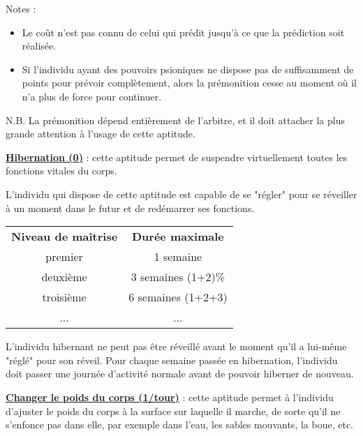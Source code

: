 \bigskip

Notes :

\bigskip

\begin{itemize}
\item Le coût n'est pas connu de celui qui prédit jusqu'à ce que la prédiction soit réalisée.
\item Si l'individu ayant des pouvoirs psioniques ne dispose pas de suffisamment de points pour prévoir complètement, alors la prémonition cesse au moment où il n'a plus de force pour continuer.
\end{itemize}

\bigskip

N.B. La prémonition dépend entièrement de l'arbitre, et il doit attacher la plus grande attention à l'usage de cette aptitude.

\bigskip

\label{guerrier-hibernation}\textbf{\uline{Hibernation (0)}} : cette aptitude permet de suspendre virtuellement toutes les fonctions vitales du corps.

\bigskip

L'individu qui dispose de cette aptitude est capable de se "régler" pour se réveiller à un moment dans le futur et de redémarrer ses fonctions.

\bigskip

\begin{tabular}{cc}
\textbf{Niveau de maîtrise} & \textbf{Durée maximale} \\
premier     & 1 semaine \\
deuxième    & 3 semaines (1+2)\% \\
troisième   & 6 semaines (1+2+3) \\
...         & ... \\
\end{tabular}

\bigskip

L'individu hibernant ne peut pas être réveillé avant le moment qu'il a lui-même "réglé" pour son réveil. Pour chaque semaine passée en hibernation, l'individu doit passer une journée d'activité normale avant de pouvoir hiberner de nouveau.

\bigskip

\label{guerrier-changer-poids}\textbf{\uline{Changer le poids du corps (1/tour)}} : cette aptitude permet à l'individu d'ajuster le poids du corps à la surface sur laquelle il marche, de sorte qu'il ne s'enfonce pas dans elle, par exemple dans l'eau, les sables mouvants, la boue, etc.

